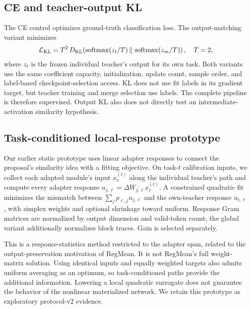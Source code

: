 \documentclass[11pt,a4paper]{article}
\begin{document}
\subsection{CE and teacher-output KL}
The CE control optimizes ground-truth classification loss. The output-matching variant minimizes
\begin{equation}
 \mathcal L_{\rm KL}=T^2\,D_{\rm KL}\!\left(
 \operatorname{softmax}(z_t/T)\,\Vert\,
 \operatorname{softmax}(z_m/T)\right),\quad T=2,
\end{equation}
where $z_t$ is the frozen individual teacher's output for its own task. Both variants use the same coefficient capacity, initialization, update count, sample order, and label-based checkpoint-selection access. KL does not use fit labels in its gradient target, but teacher training and merge selection use labels. The complete pipeline is therefore supervised. Output KL also does not directly test an intermediate-activation similarity hypothesis.

\subsection{Task-conditioned local-response prototype}
Our earlier static prototype uses linear adapter responses to connect the proposal's similarity idea with a fitting objective. On task-$t$ calibration inputs, we collect each adapted module's input $x_\ell^{(t)}$ along the individual teacher's path and compute every adapter response $u_{j,\ell}=\Delta W_{j,\ell}x_\ell^{(t)}$. A constrained quadratic fit minimizes the mismatch between $\sum_j p_{\ell,j}u_{j,\ell}$ and the own-teacher response $u_{t,\ell}$, with simplex weights and optional shrinkage toward uniform. Response Gram matrices are normalized by output dimension and valid-token count; the global variant additionally normalizes block traces. Gain is selected separately.

This is a response-statistics method restricted to the adapter span, related to the output-preservation motivation of RegMean. It is not RegMean's full weight-matrix solution. Using identical inputs and equally weighted targets also admits uniform averaging as an optimum, so task-conditioned paths provide the additional information. Lowering a local quadratic surrogate does not guarantee the behavior of the nonlinear materialized network. We retain this prototype as exploratory protocol-v2 evidence.

\newpage
\end{document}
